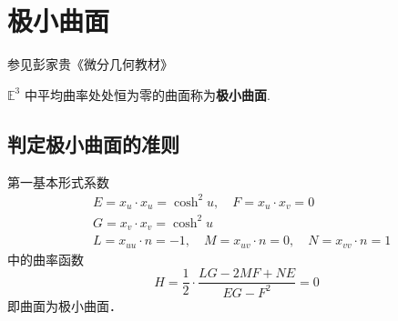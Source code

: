 \section{极小曲面}

参见彭家贵《微分几何教材》

\begin{definition}[极小曲面]
$\mathbb{E}^3$ 中平均曲率处处恒为零的曲面称为\textbf{极小曲面}.
\end{definition}
\subsection{判定极小曲面的准则}

第一基本形式系数
\[
\begin{aligned}
& E=x_u \cdot x_u=\cosh ^2 u, \quad F=x_u \cdot x_v=0 \\
& G=x_v \cdot x_v=\cosh ^2 u \\
& L=x_{u u} \cdot n=-1, \quad M=x_{u v} \cdot n=0, \quad N=x_{v v} \cdot n=1
\end{aligned}
\]
中的曲率函数
\[
H=\frac{1}{2} \cdot \frac{L G-2 M F+N E}{E G-F^2}=0
\]
即曲面为极小曲面．
